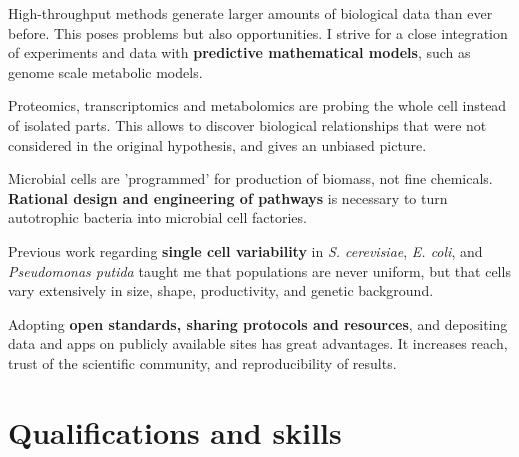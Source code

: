\documentclass[11pt, a4paper, sans, blue]{moderncv}
\begin{document}

{High-throughput methods generate larger amounts of biological data than ever before. This poses problems but also opportunities. I strive for a close integration of experiments and data with \textbf{predictive mathematical models}, such as genome scale metabolic models.}

{Proteomics, transcriptomics and metabolomics are probing the whole cell instead of isolated parts. This allows to discover biological relationships that were not considered in the original hypothesis, and gives an unbiased picture.}

{Microbial cells are 'programmed' for production of biomass, not fine chemicals. \textbf{Rational design and engineering of pathways} is necessary to turn autotrophic bacteria into microbial cell factories.}

{Previous work regarding \textbf{single cell variability} in \textit{S. cerevisiae}, \textit{E. coli}, and \textit{Pseudomonas putida} taught me that populations are never uniform, but that cells vary extensively in size, shape, productivity, and genetic background.}

{Adopting \textbf{open standards, sharing protocols and resources}, and depositing data and apps on publicly available sites has great advantages. It increases reach, trust of the scientific community, and reproducibility of results.}


\section{Qualifications and skills}
	
\end{document}
